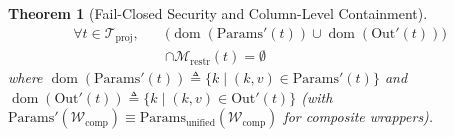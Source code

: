 \documentclass[conference,10pt]{IEEEtran}
\newtheorem{theorem}{Theorem}
\begin{document}
\begin{theorem}[Fail-Closed Security and Column-Level Containment]
\begin{equation}
\begin{aligned}
\forall t \in \mathcal{T}_{\text{proj}}, \quad &\big(\operatorname{dom}(\text{Params}'(t)) \cup \operatorname{dom}(\text{Out}'(t))\big) \\
&\cap \mathcal{M}_{\text{restr}}(t) = \emptyset
\end{aligned}
\end{equation}
where $\operatorname{dom}(\text{Params}'(t)) \triangleq \{k \mid (k, v) \in \text{Params}'(t)\}$ and $\operatorname{dom}(\text{Out}'(t)) \triangleq \{k \mid (k, v) \in \text{Out}'(t)\}$ (with $\text{Params}'(\mathcal{W}_{\text{comp}}) \equiv \text{Params}_{\text{unified}}(\mathcal{W}_{\text{comp}})$ for composite wrappers).
\end{theorem}
\end{document}
